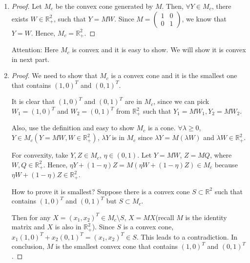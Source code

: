 \documentclass[12pt]{article}
\begin{document}
\begin{enumerate}[label = (\alph*)]
\item 

\begin{proof}

Let $M_c$ be the convex cone generated by $M$. Then, $\forall Y\in M_c$, there exists $W\in\mathbb R^2_+$, such that $Y = MW$. Since $M = \begin{pmatrix}
1 & 0 \\
0 & 1
\end{pmatrix}$, we know that $Y = W$. Hence, $M_c = \mathbb R_+^2$.

\end{proof}

{\color{red}Attention:} Here $M_c$ is convex and it is easy to show. We will show it is convex in next part.


\item

\begin{proof}

We need to show that $M_c$ is a convex cone and it is the smallest one that contains $(1, 0)^T$ and $(0,1)^T$. 

It is clear that $(1,0)^T$ and $(0,1)^T$ are in $M_c$, since we can pick $W_1 = (1,0)^T$ and $W_2 = (0,1)^T$ from $\mathbb R^2_+$ such that $Y_1 = MW_1, Y_2 = MW_2$.

Also, use the definition and easy to show $M_c$ is a cone. $\forall \lambda \geqslant 0$, $Y\in M_c (Y = MW, W\in \mathbb R^2_+)$, $\lambda Y$ is in $M_c$ since $\lambda Y = M(\lambda W)$ and $\lambda W \in \mathbb R^2_+$.

For convexity, take $Y, Z \in M_c$, $\eta \in (0, 1)$. Let $Y= MW$, $Z = MQ$, where $W, Q\in \mathbb{R}^2_+$. Hence, $\eta Y + (1-\eta )Z = M(\eta W + (1-\eta )Z) \in M_c$ because $\eta W + (1-\eta )Z \in \mathbb{R}^2_+ $.

How to prove it is smallest? Suppose there is a convex cone $S\subset  \mathbb{R}^2$ such that contains $(1, 0)^T$ and $(0,1)^T$ but $S\subset M_c$.

Then for any $X = (x_1, x_2)^T \in M_c \setminus S $, $X = MX$(recall $M$ is the identity matrix and $X$ is also in $\mathbb R^2_+$). Since $S$ is a convex cone, $x_1(1, 0)^T + x_2 (0, 1)^T = (x_1, x_2)^T \in S$. This leads to a contradiction. In conclusion, $M$ is the smallest convex cone that contains $(1, 0)^T$ and $(0,1)^T$.

\end{proof}

\end{enumerate}
\end{document}
